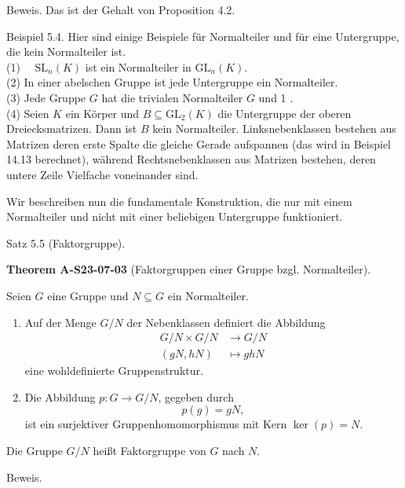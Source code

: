\documentclass[10pt, letterpaper]{article}
\newcommand{\CustomHeading}[3]{%
  \par\medskip\noindent%
  \textbf{#1 #2} \textnormal{(#3)}.\enskip%
}
\newenvironment{THEO}[2]{\begin{unitbox}\CustomHeading{Theorem}{#1}{#2}}{\end{unitbox}}
\begin{document}
Beweis. Das ist der Gehalt von Proposition 4.2.

Beispiel 5.4. Hier sind einige Beispiele für Normalteiler und für eine Untergruppe, die kein Normalteiler ist.\\
(1) $\quad \mathrm{SL}_{n}(K)$ ist ein Normalteiler in $\mathrm{GL}_{n}(K)$.\\
(2) In einer abelschen Gruppe ist jede Untergruppe ein Normalteiler.\\
(3) Jede Gruppe $G$ hat die trivialen Normalteiler $G$ und 1 .\\
(4) Seien $K$ ein Körper und $B \subseteq \mathrm{GL}_{2}(K)$ die Untergruppe der oberen Dreiecksmatrizen. Dann ist $B$ kein Normalteiler. Linksnebenklassen bestehen aus Matrizen deren erste Spalte die gleiche Gerade aufspannen (das wird in Beispiel 14.13 berechnet), während Rechtsnebenklassen aus Matrizen bestehen, deren untere Zeile Vielfache voneinander sind.



Wir beschreiben nun die fundamentale Konstruktion, die nur mit einem Normalteiler und nicht mit einer beliebigen Untergruppe funktioniert.



Satz 5.5 (Faktorgruppe). 

\begin{THEO}{A-S23-07-03}{Faktorgruppen einer Gruppe bzgl. Normalteiler}
Seien $G$ eine Gruppe und $N \subseteq G$ ein Normalteiler.
\begin{enumerate}
  \item Auf der Menge \( G / N \) der Nebenklassen definiert die Abbildung
  \[
    \begin{aligned}
      G / N \times G / N &\longrightarrow G / N \\
      (gN, hN) &\longmapsto ghN
    \end{aligned}
  \]
  eine wohldefinierte Gruppenstruktur.

  \item Die Abbildung \( p: G \to G / N \), gegeben durch
  \[
    p(g) = gN,
  \]
  ist ein surjektiver Gruppenhomomorphismus mit Kern \( \ker(p) = N \).
\end{enumerate}
Die Gruppe $G / N$ heißt Faktorgruppe von $G$ nach $N$.
\end{THEO}


Beweis. 
\end{document}
